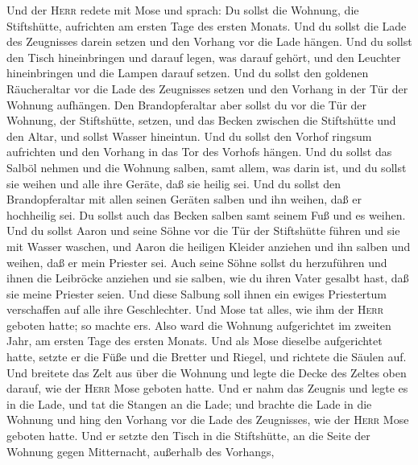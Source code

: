  Und der \textsc{Herr} redete mit Mose und sprach:
 Du sollst die Wohnung, die Stiftshütte, aufrichten am
ersten Tage des ersten Monats.  Und du sollst die Lade des
Zeugnisses darein setzen und den Vorhang vor die Lade hängen.
 Und du sollst den Tisch hineinbringen und darauf legen,
was darauf gehört, und den Leuchter hineinbringen und die Lampen darauf
setzen.  Und du sollst den goldenen Räucheraltar vor die
Lade des Zeugnisses setzen und den Vorhang in der Tür der Wohnung
aufhängen.  Den Brandopferaltar aber sollst du vor die Tür
der Wohnung, der Stiftshütte, setzen,  und das Becken
zwischen die Stiftshütte und den Altar, und sollst Wasser hineintun.
 Und du sollst den Vorhof ringsum aufrichten und den
Vorhang in das Tor des Vorhofs hängen.  Und du sollst das
Salböl nehmen und die Wohnung salben, samt allem, was darin ist, und du
sollst sie weihen und alle ihre Geräte, daß sie heilig sei.
 Und du sollst den Brandopferaltar mit allen seinen
Geräten salben und ihn weihen, daß er hochheilig sei.  Du
sollst auch das Becken salben samt seinem Fuß und es weihen.
 Und du sollst Aaron und seine Söhne vor die Tür der
Stiftshütte führen und sie mit Wasser waschen,  und Aaron
die heiligen Kleider anziehen und ihn salben und weihen, daß er mein
Priester sei.  Auch seine Söhne sollst du herzuführen und
ihnen die Leibröcke anziehen  und sie salben, wie du
ihren Vater gesalbt hast, daß sie meine Priester seien. Und diese
Salbung soll ihnen ein ewiges Priestertum verschaffen auf alle ihre
Geschlechter.  Und Mose tat alles, wie ihm der
\textsc{Herr} geboten hatte; so machte er\textquotesingle s.
 Also ward die Wohnung aufgerichtet im zweiten Jahr, am
ersten Tage des ersten Monats.  Und als Mose dieselbe
aufgerichtet hatte, setzte er die Füße und die Bretter und Riegel, und
richtete die Säulen auf.  Und breitete das Zelt aus über
die Wohnung und legte die Decke des Zeltes oben darauf, wie der
\textsc{Herr} Mose geboten hatte.  Und er nahm das
Zeugnis und legte es in die Lade, und tat die Stangen an die Lade;
 und brachte die Lade in die Wohnung und hing den Vorhang
vor die Lade des Zeugnisses, wie der \textsc{Herr} Mose geboten hatte.
 Und er setzte den Tisch in die Stiftshütte, an die Seite
der Wohnung gegen Mitternacht, außerhalb des Vorhangs, 
